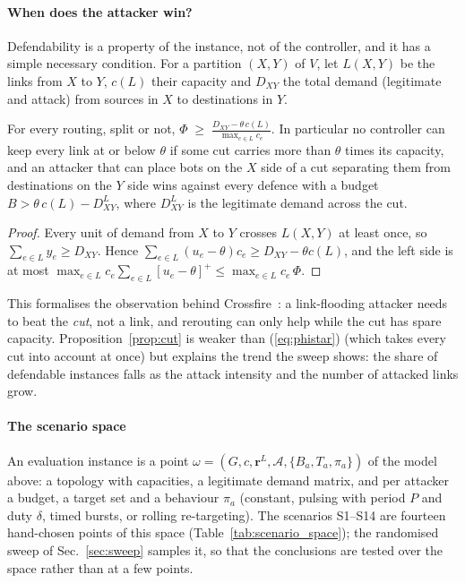 \paragraph{When does the attacker win?}
Defendability is a property of the instance, not of the controller, and it has a simple necessary
condition. For a partition $(X,Y)$ of $V$, let $L(X,Y)$ be the links from $X$ to $Y$, $c(L)$ their
capacity and $D_{XY}$ the total demand (legitimate and attack) from sources in $X$ to destinations in
$Y$.
\begin{proposition}\label{prop:cut}
For every routing, split or not,
$\displaystyle \Phi\;\ge\;\frac{D_{XY}-\theta\,c(L)}{\max_{e\in L}c_e}$.
In particular no controller can keep every link at or below $\theta$ if some cut carries more than
$\theta$ times its capacity, and an attacker that can place bots on the $X$ side of a cut separating
them from destinations on the $Y$ side wins against every defence with a budget
$B>\theta\,c(L)-D^{L}_{XY}$, where $D^{L}_{XY}$ is the legitimate demand across the cut.
\end{proposition}
\begin{proof}
Every unit of demand from $X$ to $Y$ crosses $L(X,Y)$ at least once, so $\sum_{e\in L}y_e\ge D_{XY}$.
Hence $\sum_{e\in L}(u_e-\theta)c_e\ge D_{XY}-\theta c(L)$, and the left side is at most
$\max_{e\in L}c_e\sum_{e\in L}[u_e-\theta]^+\le\max_{e\in L}c_e\,\Phi$.
\end{proof}
This formalises the observation behind Crossfire~\cite{kang2013crossfire}: a link-flooding attacker
needs to beat the \emph{cut}, not a link, and rerouting can only help while the cut has spare capacity.
Proposition~\ref{prop:cut} is weaker than (\ref{eq:phistar}) (which takes every cut into account at
once) but explains the trend the sweep shows: the share of defendable instances falls as the attack
intensity and the number of attacked links grow.

\paragraph{The scenario space}
An evaluation instance is a point $\omega=(G,c,\mathbf{r}^L,\mathcal{A},\{B_a,T_a,\pi_a\})$ of the
model above: a topology with capacities, a legitimate demand matrix, and per attacker a budget, a target
set and a behaviour $\pi_a$ (constant, pulsing with period $P$ and duty $\delta$, timed bursts, or
rolling re-targeting). The scenarios S1--S14 are fourteen hand-chosen points of this space
(Table~\ref{tab:scenario_space}); the randomised sweep of Sec.~\ref{sec:sweep} samples it, so that the
conclusions are tested over the space rather than at a few points.

